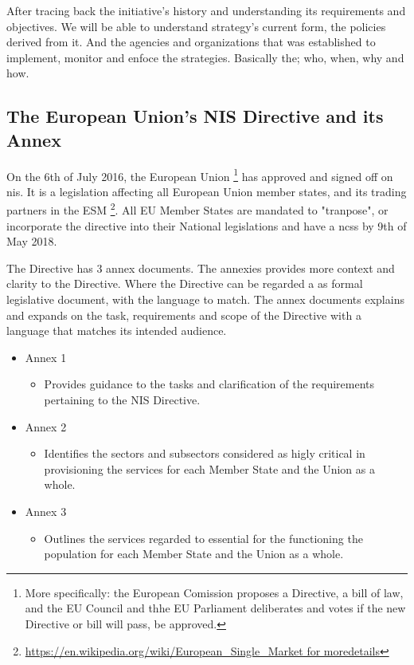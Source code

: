After tracing back the initiative's history and understanding its requirements and objectives. We will be able to understand strategy's current form, the policies derived from it. And the agencies and organizations that was established to implement, monitor and enfoce the strategies. Basically the; who, when, why and how.

\subsection{The European Union's NIS Directive and its Annex}

On the 6th of July 2016, the European Union \footnote[2]{More specifically: the European Comission proposes a Directive, a bill of law, and the EU Council and thhe EU Parliament deliberates and votes if the new Directive or bill will pass, be approved.} has approved and signed off on \acrfull{nis}. It is a legislation affecting all European Union member states, and its trading partners in the \Gls{ESM} \footnote[3]{\url{https://en.wikipedia.org/wiki/European_Single_Market for moredetails}}. All EU Member States are mandated to "tranpose", or incorporate the directive into their National legislations and have a \acrfull{ncss} by 9th of May 2018.

The Directive has 3 annex documents. The annexies provides more context and clarity to the Directive. Where the Directive can be regarded a as formal legislative document, with the language to match. The annex documents explains and expands on the task, requirements and scope of the Directive with a language that matches its intended audience.

\begin{itemize}
    \item Annex 1
        \begin{itemize}
            \item Provides guidance to the tasks and clarification of the requirements pertaining to the NIS Directive.
        \end{itemize}    
    \item Annex 2
        \begin{itemize}
            \item Identifies the sectors and subsectors considered as higly critical in provisioning the services for each Member State and the Union as a whole.
        \end{itemize}
    \item Annex 3
        \begin{itemize}
            \item Outlines the services regarded to essential for the functioning the population for each Member State and the Union as a whole.
        \end{itemize}
\end{itemize}


